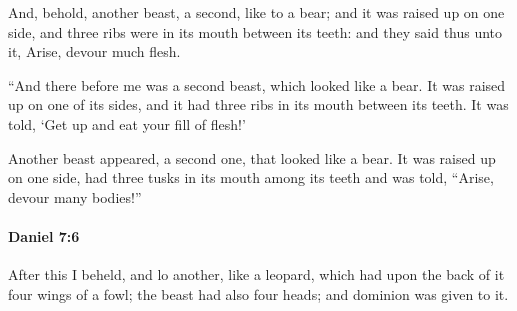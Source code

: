 			\begin{versebox}
					\item[BHS] 
					\item[LXX] 
					\item[ASV] And, behold, another beast, a second, like to a bear; and it was raised up on one side, and three ribs were in its mouth between its teeth: and they said thus unto it, Arise, devour much flesh.
					\item[NIV] “And there before me was a second beast, which looked like a bear. It was raised up on one of its sides, and it had three ribs in its mouth between its teeth. It was told, ‘Get up and eat your fill of flesh!’
					\item[NRSV] Another beast appeared, a second one, that looked like a bear. It was raised up on one side, had three tusks in its mouth among its teeth and was told, “Arise, devour many bodies!”
			\end{versebox}

		\paragraph{Daniel 7:6} %
			\label{DANIEL-7-6}

			After this I beheld, and lo another, like a leopard, which had upon the back of it four wings of a fowl; the beast had also four heads; and dominion was given to it.

